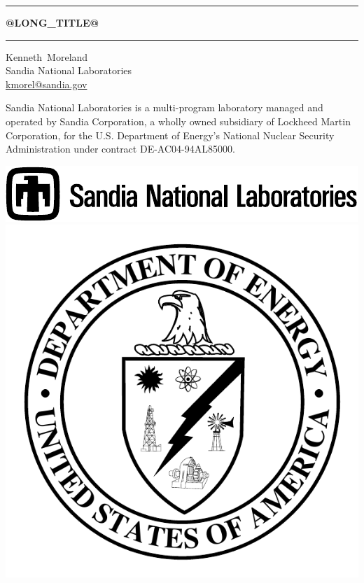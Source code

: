 \documentclass[@GLOBAL_OPTIONS@]{book}
\begin{document}
\frontmatter

\sloppy

\begin{titlepage}


  \noindent\rule{\linewidth}{1.5pt}
  \begin{centering}
    \Huge \bfseries
    @LONG_TITLE@

  \end{centering}
  \noindent\rule{\linewidth}{1.5pt}


  \begin{centering}
    \Large
    Kenneth~Moreland \\
    \small
    Sandia National Laboratories \\
    \href{mailto:kmorel@sandia.gov}{kmorel@sandia.gov} \\
  \end{centering}


  \begin{centering}
    \rmfamily\tiny

    Sandia National Laboratories is a multi-program laboratory managed and
    operated by Sandia Corporation, a wholly owned subsidiary of Lockheed
    Martin Corporation, for the U.S. Department of Energy's National
    Nuclear Security Administration under contract DE-AC04-94AL85000.

  \end{centering}
  \noindent
  \includegraphics[height=.25in]{images/snllineblk}
  \hfill
  \includegraphics[height=.35in]{images/DOEbwlogo}
\end{titlepage}

\end{document}
